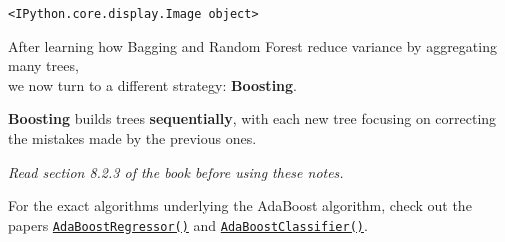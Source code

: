 \documentclass[
  letterpaper,
  DIV=11,
  numbers=noendperiod]{scrreprt}
\begin{document}
\begin{verbatim}
<IPython.core.display.Image object>
\end{verbatim}

After learning how Bagging and Random Forest reduce variance by
aggregating many trees,\\
we now turn to a different strategy: \textbf{Boosting}.

\textbf{Boosting} builds trees \textbf{sequentially}, with each new tree
focusing on correcting the mistakes made by the previous ones.

\emph{Read section 8.2.3 of the book before using these notes.}

For the exact algorithms underlying the AdaBoost algorithm, check out
the papers
\href{https://citeseerx.ist.psu.edu/document?repid=rep1&type=pdf&doi=6d8226a52ebc70c8d97ccae10a74e1b0a3908ec1}{\texttt{AdaBoostRegressor()}}
and
\href{https://dept.stat.lsa.umich.edu/~jizhu/pubs/Zhu-SII09.pdf}{\texttt{AdaBoostClassifier()}}.
\end{document}
